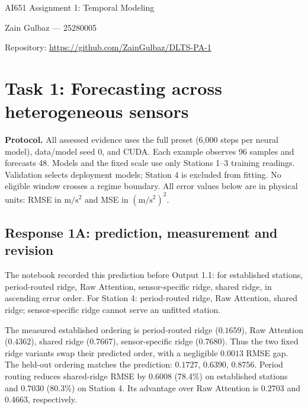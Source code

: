 \documentclass[10pt]{article}
\begin{document}
\begin{center}\Large AI651 Assignment 1: Temporal Modeling\end{center}
Zain Gulbaz --- 25280005\par
Repository: \url{https://github.com/ZainGulbaz/DLTS-PA-1}\par
\section*{Task 1: Forecasting across heterogeneous sensors}
\textbf{Protocol.} All assessed evidence uses the full preset (6,000 steps per neural model), data/model seed 0, and CUDA. Each example observes 96 samples and forecasts 48. Models and the fixed scale use only Stations 1--3 training readings. Validation selects deployment models; Station 4 is excluded from fitting. No eligible window crosses a regime boundary. All error values below are in physical units: RMSE in $\mathrm{m/s^2}$ and MSE in $(\mathrm{m/s^2})^2$.

\subsection*{Response 1A: prediction, measurement and revision}
The notebook recorded this prediction before Output 1.1: for established stations, period-routed ridge, Raw Attention, sensor-specific ridge, shared ridge, in ascending error order. For Station 4: period-routed ridge, Raw Attention, shared ridge; sensor-specific ridge cannot serve an unfitted station.

The measured established ordering is period-routed ridge ($0.1659$), Raw Attention ($0.4362$), shared ridge ($0.7667$), sensor-specific ridge ($0.7680$). Thus the two fixed ridge variants swap their predicted order, with a negligible $0.0013$ RMSE gap. The held-out ordering matches the prediction: $0.1727$, $0.6390$, $0.8756$. Period routing reduces shared-ridge RMSE by $0.6008$ (78.4\%) on established stations and $0.7030$ (80.3\%) on Station 4. Its advantage over Raw Attention is $0.2703$ and $0.4663$, respectively.
\end{document}
